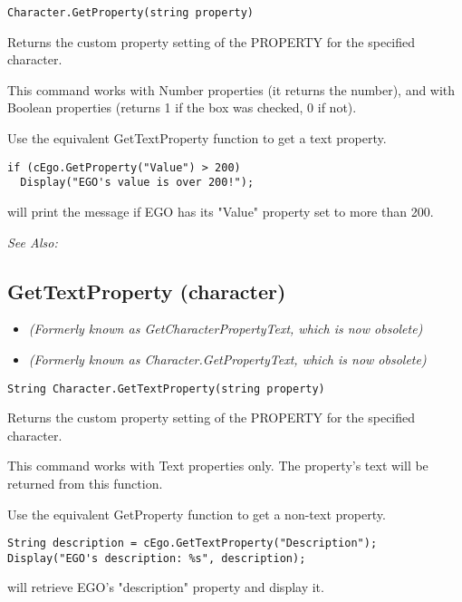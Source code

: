\begin{verbatim}
Character.GetProperty(string property)
\end{verbatim}
Returns the custom property setting of the PROPERTY for the specified character.

This command works with Number properties (it returns the number), and with Boolean
properties (returns 1 if the box was checked, 0 if not).

Use the equivalent GetTextProperty function to get a text property.

\begin{verbatim}
if (cEgo.GetProperty("Value") > 200)
  Display("EGO's value is over 200!");
\end{verbatim}
will print the message if EGO has its "Value" property set to more than 200.

\it{See Also:} 


\subsection{GetTextProperty (character)}\label{Character.GetTextProperty}%

\begin{itemize}
\item \it{(Formerly known as GetCharacterPropertyText, which is now obsolete)}
\item \it{(Formerly known as Character.GetPropertyText, which is now obsolete)}
\end{itemize}

\begin{verbatim}
String Character.GetTextProperty(string property)
\end{verbatim}
Returns the custom property setting of the PROPERTY for the specified character.

This command works with Text properties only. The property's text will be
returned from this function.

Use the equivalent GetProperty function to get a non-text property.

\begin{verbatim}
String description = cEgo.GetTextProperty("Description");
Display("EGO's description: %s", description);
\end{verbatim}
will retrieve EGO's "description" property and display it.

